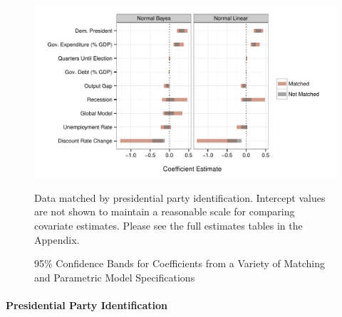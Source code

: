 \documentclass[a4paper]{article}\usepackage{graphicx, color}
\newenvironment{knitrout}{}{} %
\begin{document}
\begin{figure}[t]
    \caption{95\% Confidence Bands for Coefficients from a Variety of Matching and Parametric Model Specifications}
    \label{CoefComparePlots}
    \begin{center}

\begin{knitrout}
\color{fgcolor}

{\centering \includegraphics[width=0.95\linewidth]{figure/CoefComparePlots} 

}



\end{knitrout}

    \end{center}
    \begin{singlespace}
        {\scriptsize{Data matched by presidential party identification. Intercept values are not shown to maintain a reasonable scale for comparing covariate estimates. Please see the full estimates tables in the Appendix.}}
    \end{singlespace}
\end{figure}

\paragraph{Presidential Party Identification}
\end{document}
